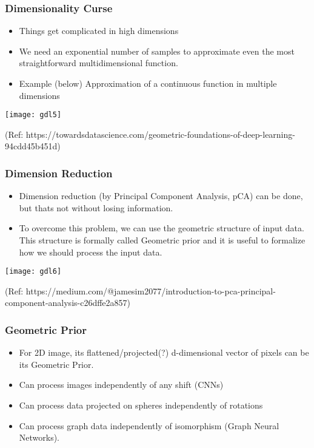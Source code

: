 \begin{frame}[fragile]\frametitle{Dimensionality Curse}

\begin{itemize}
\item Things get complicated in high dimensions
\item We need an exponential number of samples to approximate even the most straightforward multidimensional function.
\item Example (below) Approximation of a continuous function in multiple dimensions
\end{itemize}
	  
\begin{center}
\texttt{[image: gdl5]}
\end{center}

{\tiny (Ref: https://towardsdatascience.com/geometric-foundations-of-deep-learning-94cdd45b451d)}		
\end{frame}

\begin{frame}[fragile]\frametitle{Dimension Reduction}

\begin{itemize}
\item Dimension reduction (by Principal Component Analysis, pCA) can be done, but thats not without losing information.
\item To overcome this problem, we can use the geometric structure of input data. This structure is formally called Geometric prior and it is useful to formalize how we should process the input data.
\end{itemize}
	  
\begin{center}
\texttt{[image: gdl6]}
\end{center}

{\tiny (Ref: https://medium.com/@jamesim2077/introduction-to-pca-principal-component-analysis-c26dffe2a857)}		
\end{frame}

\begin{frame}[fragile]\frametitle{Geometric Prior}

\begin{itemize}
\item For 2D image, its flattened/projected(?) d-dimensional vector of pixels can be its Geometric Prior.
\item Can process images independently of any shift (CNNs)
\item Can process data projected on spheres independently of rotations
\item Can process graph data independently of isomorphism (Graph Neural Networks).
\end{itemize}
	
\end{frame}

